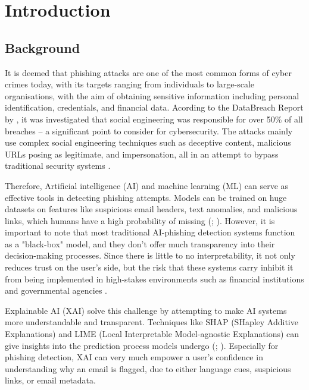 \section{Introduction}

\subsection*{Background}
It is deemed that phishing attacks are one of the most common forms of cyber crimes today, with its targets ranging from individuals to large-scale organisations, with the aim of obtaining sensitive information including personal identification, credentials, and financial data. Acording to the DataBreach Report by \cite{verizon2023}, it was investigated that social engineering was responsible for over 50\% of all breaches -- a significant point to consider for cybersecurity. The attacks mainly use complex social engineering techniques such as deceptive content, malicious URLs posing as legitimate, and impersonation, all in an attempt to bypass traditional security systems \citep{marett2009effectiveness}. \newline

\noindent Therefore, Artificial intelligence (AI) and machine learning (ML) can serve as effective tools in detecting phishing attempts. Models can be trained on huge datasets on features like suspicious email headers, text anomalies, and malicious links, which humans have a high probability of missing (\cite{chandrasekaran2006phoney}; \cite{jain2022survey}). However, it is important to note that most traditional AI-phishing detection systems function as a "black-box" model, and they don't offer much transparency into their decision-making processes. Since there is little to no interpretability, it not only reduces trust on the user's side, but the risk that these systems carry inhibit it from being implemented in high-stakes environments such as financial institutions and governmental agencies \citep{ribeiro2016model}. \newline

\noindent Explainable AI (XAI) solve this challenge by attempting to make AI systems more understandable and transparent. Techniques like SHAP (SHapley Additive Explanations) and LIME (Local Interpretable Model-agnostic Explanations) can give insights into the prediction process models undergo (\cite{lundberg2017unified}; \cite{ribeiro2016model}). Especially for phishing detection, XAI can very much empower a user's confidence in understanding why an email is flagged, due to either language cues, suspicious links, or email metadata. \newline

